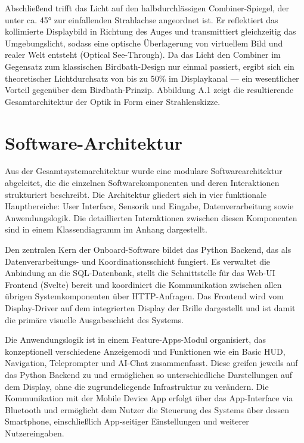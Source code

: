 Abschließend trifft das Licht auf den halbdurchlässigen Combiner-Spiegel, der unter ca. 45° zur einfallenden Strahlachse angeordnet ist. Er reflektiert das kollimierte Displaybild in Richtung des Auges und transmittiert gleichzeitig das Umgebungslicht, sodass eine optische Überlagerung von virtuellem Bild und realer Welt entsteht (Optical See-Through). Da das Licht den Combiner im Gegensatz zum klassischen Birdbath-Design nur einmal passiert, ergibt sich ein theoretischer Lichtdurchsatz von bis zu 50\% im Displaykanal — ein wesentlicher Vorteil gegenüber dem Birdbath-Prinzip. Abbildung A.1 zeigt die resultierende Gesamtarchitektur der Optik in Form einer Strahlenskizze.

\section{Software-Architektur}
\label{sec:Software-Architektur}
Aus der Gesamtsystemarchitektur wurde eine modulare Softwarearchitektur abgeleitet, die die einzelnen Softwarekomponenten und deren Interaktionen strukturiert beschreibt. Die Architektur gliedert sich in vier funktionale Hauptbereiche: User Interface, Sensorik und Eingabe, Datenverarbeitung sowie Anwendungslogik. Die detaillierten Interaktionen zwischen diesen Komponenten sind in einem Klassendiagramm im Anhang dargestellt.

Den zentralen Kern der Onboard-Software bildet das Python Backend, das als \newline Datenverarbeitungs- und Koordinationsschicht fungiert. Es verwaltet die Anbindung an die SQL-Datenbank, stellt die Schnittstelle für das Web-UI Frontend (Svelte) bereit und koordiniert die Kommunikation zwischen allen übrigen Systemkomponenten über HTTP-Anfragen. Das Frontend wird vom Display-Driver auf dem integrierten Display der Brille dargestellt und ist damit die primäre visuelle Ausgabeschicht des Systems.

Die Anwendungslogik ist in einem Feature-Apps-Modul organisiert, das konzeptionell verschiedene Anzeigemodi und Funktionen wie ein Basic HUD, Navigation, Teleprompter und AI-Chat zusammenfasst. Diese greifen jeweils auf das Python Backend zu und ermöglichen so unterschiedliche Darstellungen auf dem Display, ohne die zugrundeliegende Infrastruktur zu verändern. Die Kommunikation mit der Mobile Device App erfolgt über das App-Interface via Bluetooth und ermöglicht dem Nutzer die Steuerung des Systems über dessen Smartphone, einschließlich App-seitiger Einstellungen und weiterer Nutzereingaben.

